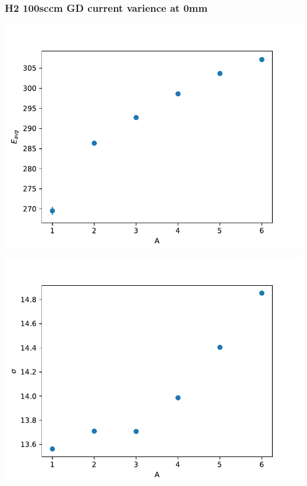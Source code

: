 \documentclass{beamer} %
\begin{document}
\begin{frame}
    \frametitle{H2 100sccm GD current varience at 0mm}
    \begin{minipage}{0.49\textwidth}
        \includegraphics[width=1.1\textwidth]{figures/CurrentVary_H2_100sccm_Energy_werrors.pdf}
    \end{minipage}
    \begin{minipage}{0.49\textwidth}
        \includegraphics[width=1.1\textwidth]{figures/CurrentVary_H2_100sccm_Energy_sigma.pdf}
    \end{minipage}
    \begin{minipage}{0.49\textwidth}

\end{minipage}
\end{frame}
\end{document}
